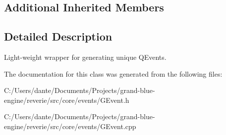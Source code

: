 \subsection*{Additional Inherited Members}


\subsection{Detailed Description}
Light-\/weight wrapper for generating unique Q\+Events. 

The documentation for this class was generated from the following files\+:\begin{DoxyCompactItemize}
\item 
C\+:/\+Users/dante/\+Documents/\+Projects/grand-\/blue-\/engine/reverie/src/core/events/G\+Event.\+h\item 
C\+:/\+Users/dante/\+Documents/\+Projects/grand-\/blue-\/engine/reverie/src/core/events/G\+Event.\+cpp\end{DoxyCompactItemize}
